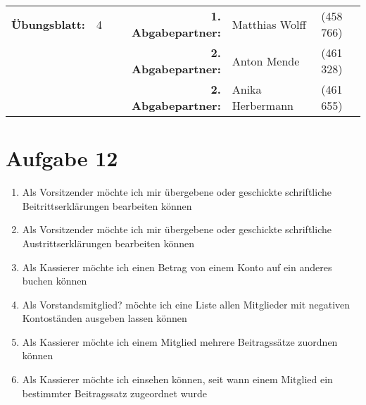 \newcommand{\obenlinks}{Software Engineering}		%

\usepackage{float}


	\begin{center}
		\begin{tabular}{|rlp{4cm}rll|}
		\hline
		 \textbf{Übungsblatt:} & 4 &   & \textbf{1. Abgabepartner:} & Matthias Wolff & (458 766)  \\
		        & & & \textbf{2. Abgabepartner:} & Anton Mende & (461 328) \\
		        & & & \textbf{2. Abgabepartner:} & Anika Herbermann & (461 655) \\ \hline
		\end{tabular}
	\end{center}
\section*{Aufgabe 12}
\begin{enumerate} [/LF10/)]
	\item Als Vorsitzender möchte ich mir übergebene oder geschickte schriftliche Beitrittserklärungen bearbeiten können
	\item  Als Vorsitzender möchte ich mir übergebene oder geschickte schriftliche Austrittserklärungen bearbeiten können
	\item Als Kassierer möchte ich einen Betrag von einem Konto auf ein anderes buchen können
	\item Als Vorstandsmitglied? möchte ich eine Liste allen Mitglieder mit negativen Kontoständen ausgeben lassen können
	\item Als Kassierer möchte ich einem Mitglied mehrere Beitragssätze zuordnen können
	\item Als Kassierer möchte ich einsehen können, seit wann einem Mitglied ein bestimmter Beitragssatz zugeordnet wurde
\end{enumerate}
